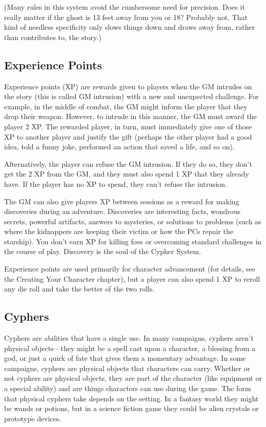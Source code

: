 \begin{multicols}{2}
(Many rules in this system avoid the cumbersome need for precision. Does it really matter if the ghost is 13 feet away from you or 18? Probably not. That kind of needless specificity only slows things down and draws away from, rather than contributes to, the story.)

\subsection{Experience Points}

Experience points (XP) are rewards given to players when the GM intrudes on the story (this is called GM intrusion) with a new and unexpected challenge. For example, in the middle of combat, the GM might inform the player that they drop their weapon. However, to intrude in this manner, the GM must award the player 2 XP. The rewarded player, in turn, must immediately give one of those XP to another player and justify the gift (perhaps the other player had a good idea, told a funny joke, performed an action that saved a life, and so on).

Alternatively, the player can refuse the GM intrusion. If they do so, they don’t get the 2 XP from the GM, and they must also spend 1 XP that they already have. If the player has no XP to spend, they can’t refuse the intrusion.

The GM can also give players XP between sessions as a reward for making discoveries during an adventure. Discoveries are interesting facts, wondrous secrets, powerful artifacts, answers to mysteries, or solutions to problems (such as where the kidnappers are keeping their victim or how the PCs repair the starship). You don’t earn XP for killing foes or overcoming standard challenges in the course of play. Discovery is the soul of the Cypher System.

Experience points are used primarily for character advancement (for details, see the Creating Your Character chapter), but a player can also spend 1 XP to reroll any die roll and take the better of the two rolls.

\subsection{Cyphers}

Cyphers are abilities that have a single use. In many campaigns, cyphers aren’t physical objects—they might be a spell cast upon a character, a blessing from a god, or just a quirk of fate that gives them a momentary advantage. In some campaigns, cyphers are physical objects that characters can carry. Whether or not cyphers are physical objects, they are part of the character (like equipment or a special ability) and are things characters can use during the game. The form that physical cyphers take depends on the setting. In a fantasy world they might be wands or potions, but in a science fiction game they could be alien crystals or prototype devices.


\end{multicols}
